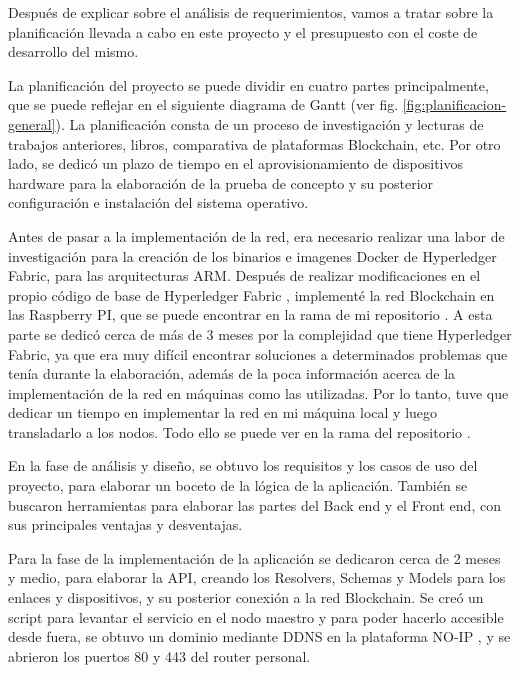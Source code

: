 Después de explicar sobre el análisis de requerimientos, vamos a tratar sobre la planificación llevada a cabo en este 
proyecto y el presupuesto con el coste de desarrollo del mismo.

\vspace{5mm}

\noindent La planificación del proyecto se puede dividir en cuatro partes principalmente, que se puede reflejar en el 
siguiente diagrama de Gantt (ver fig. \ref{fig:planificacion-general}). La planificación consta de un proceso de 
investigación y lecturas de trabajos anteriores, libros, comparativa de plataformas Blockchain, etc. Por otro lado, se 
dedicó un plazo de tiempo en el aprovisionamiento de dispositivos hardware para la elaboración de la prueba de concepto y 
su posterior configuración e instalación del sistema operativo.

\vspace{5mm}

\noindent Antes de pasar a la implementación de la red, era necesario realizar una labor de investigación para la creación 
de los binarios e imagenes Docker de Hyperledger Fabric, para las arquitecturas ARM. Después de realizar modificaciones en 
el propio código de base de Hyperledger Fabric \cite{fork-fabric-baseimage}, implementé la red Blockchain en las Raspberry PI, 
que se puede encontrar en la rama  de mi repositorio \cite{repo}. A esta parte se dedicó cerca de más 
de 3 meses por la complejidad que tiene Hyperledger Fabric, ya que era muy difícil encontrar soluciones a determinados 
problemas que tenía durante la elaboración, además de la poca información acerca de la implementación de la red en máquinas 
como las utilizadas. Por lo tanto, tuve que dedicar un tiempo en implementar la red en mi máquina local y luego 
transladarlo a los nodos. Todo ello se puede ver en la rama  del repositorio \cite{repo}. 

\vspace{5mm}

\noindent En la fase de análisis y diseño, se obtuvo los requisitos y los casos de uso del proyecto, para elaborar un 
boceto de la lógica de la aplicación. También se buscaron herramientas para elaborar las partes del Back end y el Front end, 
con sus principales ventajas y desventajas.

\vspace{5mm}

\noindent Para la fase de la implementación de la aplicación se dedicaron cerca de 2 meses y medio, para elaborar la API, 
creando los Resolvers, Schemas y Models para los enlaces y dispositivos, y su posterior conexión a la red Blockchain. Se 
creó un script para levantar el servicio en el nodo maestro y para poder hacerlo accesible desde fuera, se obtuvo un 
dominio mediante DDNS en la plataforma NO-IP \cite{no-ip}, y se abrieron los puertos 80 y 443 del router personal.


